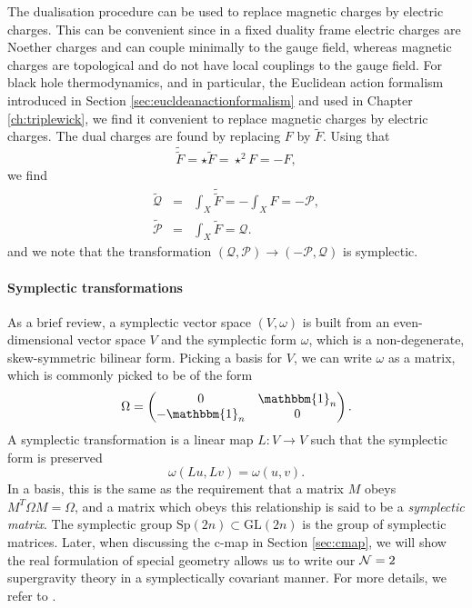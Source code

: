 The dualisation procedure can be used to replace magnetic charges by electric charges. This can be convenient since in a fixed duality frame electric charges are Noether charges and can couple minimally to the gauge field, whereas magnetic charges are topological and do not have local couplings to the gauge field. For black hole thermodynamics, and in particular, the Euclidean action formalism introduced in Section \ref{sec:eucldeanactionformalism} and used in Chapter \ref{ch:triplewick}, we find it convenient to replace magnetic charges by electric charges. The dual charges are found by replacing $F$ by $\tilde{F}$. Using that 
\[
\tilde{\tilde{F}} =  \star \tilde{F} = \star^2 F = -F,
\]
we find
\begin{eqnarray}
\tilde{\mathcal{Q}}& =&   \int_X \tilde{\tilde{F}} = -  \int_X  F = - \mathcal{P}, \\
\tilde{\mathcal{P}} &=&  \int_X \tilde{F} = \mathcal{Q}.
\end{eqnarray}
and we note that the transformation $(\mathcal{Q}, \mathcal{P}) \rightarrow (-\mathcal{P}, \mathcal{Q})$ is symplectic. 

\paragraph{Symplectic transformations} As a brief review, a symplectic vector space $(V, \omega)$ is built from an even-dimensional vector space $V$ and the symplectic form  $\omega$, which is a non-degenerate, skew-symmetric bilinear form. Picking a basis for $V$, we can write $\omega$ as a matrix, which is commonly picked to be of the form
\begin{equation*}
	\Omega = \pmat{0}{\mathbbm{1}_n}{-\mathbbm{1}_n}{0}.
\end{equation*}
A symplectic transformation is a linear map $L: V \to V$ such that the symplectic form is preserved
\begin{equation*}
	\omega(L u, L v) = \omega(u,v).
\end{equation*}
In a basis, this is the same as the requirement that a matrix $M$ obeys $M^T \Omega M = \Omega$, and a matrix which obeys this relationship is said to be a \emph{symplectic matrix}. The symplectic group $\text{Sp}(2n) \subset \text{GL}(2n)$ is the group of symplectic matrices. Later, when discussing the c-map in Section \ref{sec:cmap}, we will show the real formulation of special geometry allows us to write our ${\cal N} = 2$ supergravity theory in a symplectically covariant manner. For more details, we refer to \cite{da2008lectures}. 

